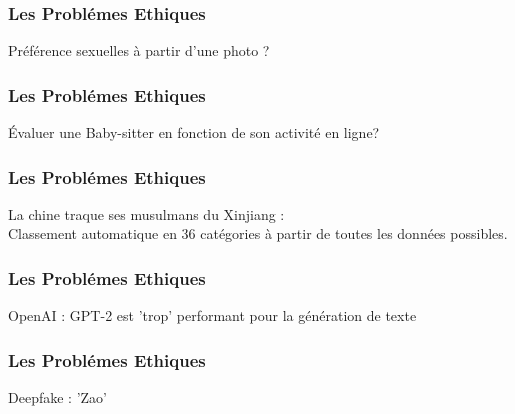\documentclass{formation}
\begin{document}
\begin{frame}
  \frametitle{Les Problémes Ethiques}
  Préférence sexuelles à partir d'une photo ?
\end{frame}

\begin{frame}
  \frametitle{Les Problémes Ethiques}
  Évaluer une Baby-sitter en fonction de son activité en ligne?
\end{frame}

\begin{frame}
  \frametitle{Les Problémes Ethiques}
  La chine traque ses musulmans du Xinjiang :\\
  Classement automatique en 36 catégories à partir de toutes les données possibles.
\end{frame}

\begin{frame}
  \frametitle{Les Problémes Ethiques}
  OpenAI : GPT-2 est 'trop' performant pour la génération de texte
\end{frame}

\begin{frame}
  \frametitle{Les Problémes Ethiques}
  Deepfake : 'Zao'
\end{frame}
\end{document}
